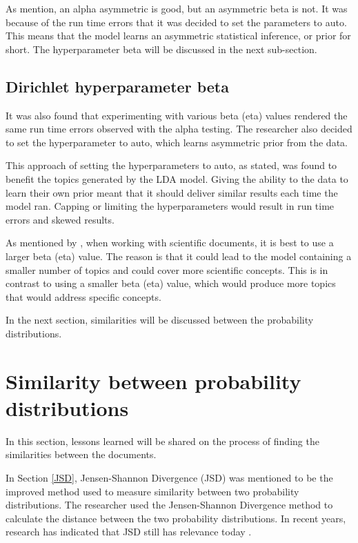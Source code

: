 As  mention, an alpha asymmetric is good, but an asymmetric beta is not. It was because of the run time errors that it was decided to set the parameters to auto. This means that the model learns an asymmetric statistical inference, or prior for short.
The hyperparameter beta will be discussed in the next sub-section.

\subsection{Dirichlet hyperparameter beta}

It was also found that experimenting with various beta (eta) values rendered the same run time errors observed with the alpha testing. The researcher also decided to set the hyperparameter to auto, which learns asymmetric prior from the data.

This approach of setting the hyperparameters to auto, as stated, was found to benefit the topics generated by the LDA model. Giving the ability to the data to learn their own prior meant that it should deliver similar results each time the model ran. Capping or limiting the hyperparameters would result in run time errors and skewed results.

As mentioned by , when working with scientific documents, it is best to use a larger beta (eta) value. The reason is that it could lead to the model containing a smaller number of topics and could cover more scientific concepts. This is in contrast to using a smaller beta (eta) value, which would produce more topics that would address specific concepts.

In the next section, similarities will be discussed between the probability distributions.

\section{Similarity between probability distributions}

In this section, lessons learned will be shared on the process of finding the similarities between the documents.

In Section \ref{JSD}, Jensen-Shannon Divergence (JSD) was mentioned to be the improved method used to measure similarity between two probability distributions. The researcher used the Jensen-Shannon Divergence method to calculate the distance between the two probability distributions. In recent years, research has indicated that JSD still has relevance today \cite{tong2016text,giles2019subject,he2015topic,chu2010topic}.

